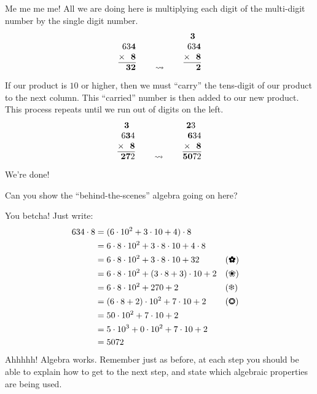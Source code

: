 Me me me me! All we are doing here is multiplying each digit of the
multi-digit number by the single digit number.
\[
\begin{array}[b]{@{}r@{}}
63\textbf{4}\\
\times~~\textbf{8}\\ \hline
~~\textbf{32}
\end{array}
\qquad
\leadsto
\qquad
\begin{array}[b]{@{}r@{}}
\textbf{3}~~\\
63\textbf{4}\\
\times~~\textbf{8}\\ \hline
~~~\textbf{2}
\end{array}
\]
If our product is $10$ or higher, then we must ``carry'' the
tens-digit of our product to the next column. This ``carried'' number
is then added to our new product. This process repeats until we run
out of digits on the left.
\[
\begin{array}[b]{@{}r@{}}
\textbf{3}~~\\
6\textbf{3}4\\
\times~~\textbf{8}\\ \hline
~\textbf{27}2
\end{array}
\qquad
\leadsto
\qquad
\begin{array}[b]{@{}r@{}}
\textbf{2}3~~\\
\textbf{6}34\\
\times~~\textbf{8}\\ \hline
\textbf{50}72
\end{array}
\]
We're done!

\begin{question}
Can you show the ``behind-the-scenes'' algebra going on here?
\end{question}

You betcha! Just write:
\begin{align*}
634 \cdot 8 &= (6\cdot 10^2 + 3\cdot 10 + 4) \cdot 8\\
&= 6\cdot 8\cdot 10^2 + 3\cdot 8\cdot 10 + 4\cdot 8\\
&= 6\cdot 8\cdot 10^2 + 3\cdot 8\cdot 10 + 32 & &\text{(\ding{95})}\\
&= 6\cdot 8\cdot 10^2 + (3\cdot 8 + 3)\cdot 10  + 2 & &\text{(\ding{96})}\\
&= 6\cdot 8\cdot 10^2 + 270  + 2 & &\text{(\ding{100})}\\
&= (6\cdot 8+2)\cdot 10^2 + 7\cdot 10 + 2& &\text{(\ding{98})}\\
&= 50\cdot 10^2 + 7\cdot 10  + 2\\
&= 5\cdot 10^3 + 0\cdot 10^2 + 7\cdot 10  + 2\\
&= 5072
\end{align*}
Ahhhhh! Algebra works. Remember just as before, at each step you
should be able to explain how to get to the next step, and state which
algebraic properties are being used.

